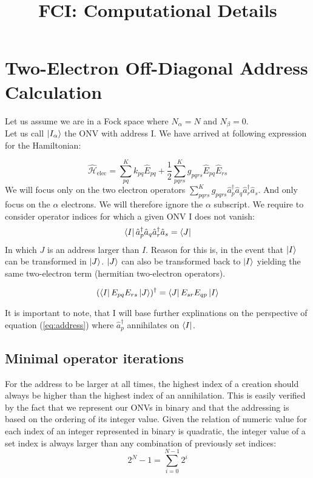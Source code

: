 \documentclass[12p]{article}
\title{FCI: Computational Details}
\author{}
\begin{document}
\maketitle

\section{Two-Electron Off-Diagonal Address Calculation}

Let us assume we are in a Fock space where $N_{\alpha} = N$ and $N_{\beta} = 0$.
\\
Let us call $\ket{I_{\alpha}}$ the ONV with address I.
We have arrived at following expression for the Hamiltonian:

      \begin{equation}\label{eq:ham}
          \hat{\mathcal{H}}_\text{elec} = \sum_{pq}^K k_{pq} \hat{E}_{pq} + \frac{1}{2} \sum_{pqrs}^K g_{pqrs} \hat{E}_{pq} \hat{E}_{rs}
      \end{equation}
We will focus only on the two electron operators $ \sum_{pqrs}^K g_{pqrs} \hat{a}^{\dagger}_{p} \hat{a}_{q}  \hat{a}^{\dagger}_{r} \hat{a}_{s}$. And only focus on the $\alpha$ electrons. We will therefore ignore the $\alpha$ subscript.
We require to consider operator indices for which a given ONV I does not vanish:
\begin{equation}
  \bra{I} \hat{a}^{\dagger}_{p} \hat{a}_{q} \hat{a}^{\dagger}_{r} \hat{a}_{s} = \bra{J}
\end{equation}
In which $J$ is an address larger than $I$. Reason for this is, in the event that $\ket{I}$ can be transformed in $\ket{J}$. $\ket{J}$ can also be transformed back to $\ket{I}$ yielding the same two-electron term (hermitian two-electron operators).

\begin{equation}
  (\bra{I} E_{pq} E_{rs} \ket{J})^\dagger = \bra{J} E_{sr} E_{qp} \ket{I}
\end{equation}

It is important to note, that I will base further explinations on the perspective of equation (\ref{eq:address}) where $\hat{a}^{\dagger}_{p}$ annihilates on $\bra{I}$.

\subsection{Minimal operator iterations}
For the address to be larger at all times, the highest index of a creation should always be higher than the highest index of an annihilation. This is easily verified by the fact that we represent our ONVs in binary and that the addressing is based on the ordering of its integer value. Given the relation of numeric value for each index of an integer represented in binary is quadratic, the integer value of a set index is always larger than any combination of previously set indices:
\begin{equation}
  2^N - 1 = \sum^{N-1}_{i=0} 2^i
\end{equation}
\end{document}
